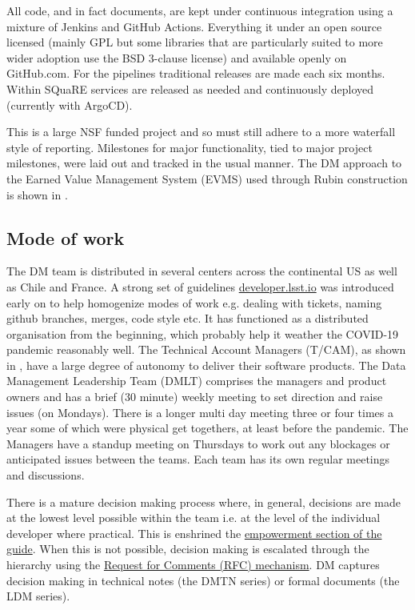All code, and in fact documents, are kept under continuous integration using a mixture of Jenkins and GitHub Actions.
Everything it under an open source licensed (mainly GPL but some libraries that are particularly suited to more wider adoption use the BSD 3-clause license) and available openly on GitHub.com.
For the pipelines traditional releases are made each six months.
Within SQuaRE services are released as needed and continuously deployed (currently with ArgoCD).

This is a large NSF funded project and so must still adhere to a more waterfall style of reporting.
Milestones for major functionality, tied to major project milestones, were laid out and tracked in the usual manner.
The DM approach to the Earned Value Management System (EVMS) used through Rubin construction is shown in \citet{DMTN-020,2016SPIE.9911E..0NK}.

\subsection{Mode of work}\label{sec:mode}
The DM  team is distributed in several centers across the continental US as well as Chile and France.
A strong set of guidelines \href{https:\\developer.lsst.io}{developer.lsst.io} was introduced early on to help homogenize modes of work e.g. dealing with tickets, naming github branches, merges, code style etc.
It has functioned as a distributed organisation from the beginning, which probably help it weather the COVID-19 pandemic reasonably well.
The Technical Account Managers (T/CAM), as shown in , have a large degree of autonomy to deliver their software products.
The Data Management Leadership Team (DMLT) comprises the managers and product owners and has a brief (30 minute) weekly meeting to set direction and raise issues (on Mondays).
There is a longer multi day meeting three or four times a year some of which were physical get togethers, at least before the pandemic.
The Managers have a standup meeting on Thursdays to work out any blockages or anticipated issues between the teams.
Each team has its own regular meetings and discussions.

There is a mature decision making process where, in general, decisions are made at the lowest level possible within the team i.e. at the level of the individual developer where practical. This is enshrined the \href{https://developer.lsst.io/team/empowerment.html}{empowerment section of the guide}.
When this is not possible, decision making is escalated through the hierarchy using  the \href{https://developer.lsst.io/communications/rfc.html}{Request for Comments (RFC) mechanism}.
DM captures decision making in technical notes (the DMTN series) or formal documents (the LDM series).


